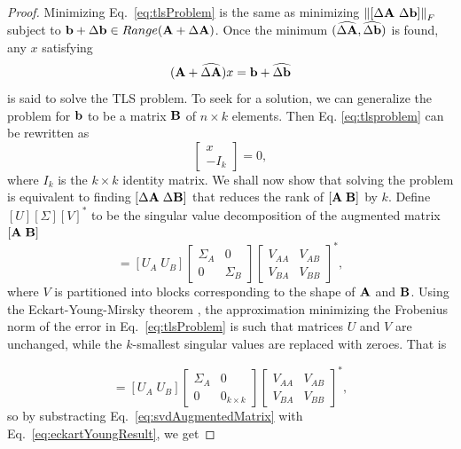 \begin{proof}

Minimizing Eq.~\eqref{eq:tlsProblem} is the same as minimizing $\left\lVert[\Delta \mathbf{A} \ \Delta \mathbf{b}]\right\rVert_F$ subject to $\mathbf{b} + \Delta \mathbf{b} \in Range(\mathbf{A} + \Delta \mathbf{A})$. Once the minimum $(\widehat{\Delta \mathbf{A}}, \widehat{\Delta \mathbf{b}})$ is found, any $x$ satisfying 
\begin{equation}
\label{eq:tlsproblem}
(\mathbf{A} + \widehat{\Delta \mathbf{A}})x = \mathbf{b} + \widehat{\Delta \mathbf{b}}
\end{equation}
is said to solve the TLS problem. To seek for a solution, we can generalize the problem for $\mathbf{b}$ to be a matrix $\mathbf{B}$ of $n \times k$ elements. Then Eq. \eqref{eq:tlsproblem} can be rewritten as
\begin{equation}
[(\bA+\dA) \; (\bB+\dB)] \begin{bmatrix} x\\ -I_k\end{bmatrix} = 0,
\end{equation}
where $I_k$ is the $k\times k$ identity matrix. We shall now show that solving the problem is equivalent to finding $[\Delta \mathbf{A}\; \Delta \mathbf{B}]$ that reduces the rank of $[\mathbf{A}\; \mathbf{B}]$ by $k$. Define $[U] [\Sigma] [V]^*$ to be the singular value decomposition of the augmented matrix $[\mathbf{A}\; \mathbf{B}]$
\begin{equation}
[\bA\; \bB] = [U_A\; U_B] \begin{bmatrix}\Sigma_A &0 \\ 0 & \Sigma_B\end{bmatrix}\begin{bmatrix}V_{AA} & V_{AB} \\ V_{BA} & V_{BB}\end{bmatrix}^*,
\label{eq:svdAugmentedMatrix}
\end{equation}
where $V$ is partitioned into blocks corresponding to the shape of $\mathbf{A}$ and $\mathbf{B}$.
Using the Eckart-Young-Mirsky theorem \cite{GOLUB1987, Eckart1936}, the approximation minimizing the Frobenius norm of the error in Eq.~\eqref{eq:tlsProblem} is such that matrices $U$ and $V$ are unchanged, while the $k$-smallest singular values are replaced with zeroes. That is

\begin{equation}
[(A+\dA)\; (B+\dB)] = [U_A\; U_B] \begin{bmatrix}\Sigma_A &0 \\ 0 & 0_{k\times k}\end{bmatrix}\begin{bmatrix}V_{AA} & V_{AB} \\ V_{BA} & V_{BB}\end{bmatrix}^*,
\label{eq:eckartYoungResult}
\end{equation}
so by substracting Eq.~\eqref{eq:svdAugmentedMatrix} with Eq.~\eqref{eq:eckartYoungResult}, we get


\end{proof}
